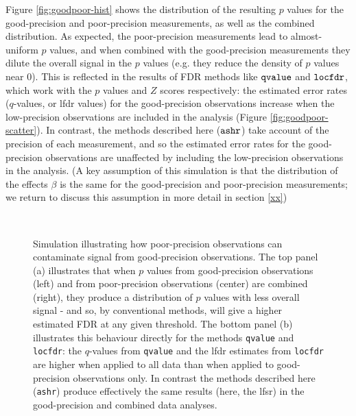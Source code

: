\documentclass[11pt]{article}
\def\qvalue{{\tt qvalue}\xspace}
\def\locfdr{{\tt locfdr}\xspace}
\def\ashr{{\tt ashr}\xspace}
\begin{document}
Figure \ref{fig:goodpoor-hist} shows the distribution of the resulting $p$ values for the good-precision and poor-precision measurements, as
well as the combined distribution. As expected, the poor-precision measurements lead to almost-uniform $p$ values, and when combined
with the good-precision measurements they dilute the overall signal in the $p$ values (e.g. they reduce the density of $p$ values near 0).
This is reflected in the results of FDR methods like $\qvalue$ and $\locfdr$, which work with the $p$ values and $Z$ scores respectively:
the estimated error rates ($q$-values, or lfdr values) for the good-precision observations increase when the low-precision observations are included in the analysis
(Figure \ref{fig:goodpoor-scatter}). In contrast, the methods described here ($\ashr$) take account of the precision of each measurement, and so
the estimated error rates for the good-precision observations are unaffected by including the low-precision observations in the analysis.
(A key assumption of this simulation is that the distribution of the effects $\beta$ is the same for the good-precision and poor-precision measurements;
we return to discuss this assumption in more detail in section \ref{xx})


\begin{figure}
\centering
{} \\
\caption{Simulation illustrating how poor-precision observations can contaminate signal from good-precision observations. The top panel (a) illustrates that when 
$p$ values from good-precision observations (left) and from poor-precision observations (center) are combined (right), they produce
a distribution of $p$ values with less overall signal - and so, by conventional methods, will give a higher estimated FDR at any given threshold.
The bottom panel (b) illustrates this behaviour directly for the methods \qvalue and \locfdr: the $q$-values from \qvalue and the lfdr estimates from \locfdr are higher when applied to all data than when applied to good-precision observations only. In contrast the methods described here (\ashr) produce effectively the same results (here, the lfsr) in the good-precision and combined data analyses.} \label{fig:goodpoor}
\end{figure}
\end{document}

